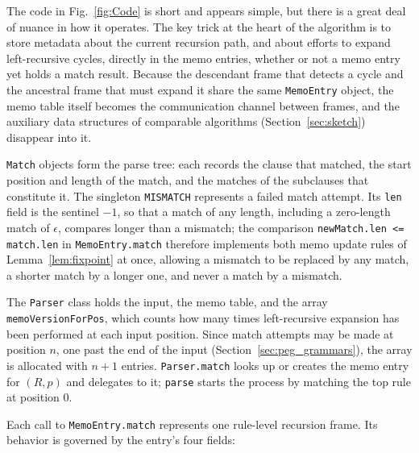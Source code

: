 \documentclass[manuscript]{acmart}
\newcommand{\cd}[1]{\texttt{#1}}
\begin{document}
The code in Fig.~\ref{fig:Code} is short and appears simple, but there is a great deal of nuance in how it operates. The key trick at the heart of the algorithm is to store metadata about the current recursion path, and about efforts to expand left-recursive cycles, directly in the memo entries, whether or not a memo entry yet holds a match result. Because the descendant frame that detects a cycle and the ancestral frame that must expand it share the same \cd{MemoEntry} object, the memo table itself becomes the communication channel between frames, and the auxiliary data structures of comparable algorithms (Section~\ref{sec:sketch}) disappear into it.

\cd{Match} objects form the parse tree: each records the clause that matched, the start position and length of the match, and the matches of the subclauses that constitute it. The singleton \cd{MISMATCH} represents a failed match attempt. Its \cd{len} field is the sentinel $-1$, so that a match of any length, including a zero-length match of $\epsilon$, compares longer than a mismatch; the comparison \cd{newMatch.len <= match.len} in \cd{MemoEntry.match} therefore implements both memo update rules of Lemma~\ref{lem:fixpoint} at once, allowing a mismatch to be replaced by any match, a shorter match by a longer one, and never a match by a mismatch.

The \cd{Parser} class holds the input, the memo table, and the array \cd{memoVersionForPos}, which counts how many times left-recursive expansion has been performed at each input position. Since match attempts may be made at position $n$, one past the end of the input (Section~\ref{sec:peg_grammars}), the array is allocated with $n + 1$ entries. \cd{Parser.match} looks up or creates the memo entry for $(R, p)$ and delegates to it; \cd{parse} starts the process by matching the top rule at position 0.

Each call to \cd{MemoEntry.match} represents one rule-level recursion frame. Its behavior is governed by the entry's four fields:
\end{document}
